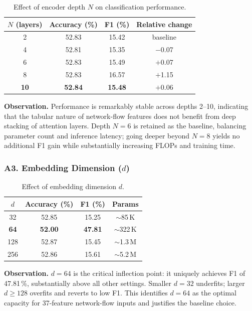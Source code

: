 \begin{table}[h]
\centering
\caption{Effect of encoder depth $N$ on classification performance.}
\label{tab:depth_sweep}
\begin{tabular}{cccc}
\toprule
$N$ (layers) & Accuracy (\%) & F1 (\%) & Relative change \\
\midrule
2  & 52.83 & 15.42 & baseline        \\
4  & 52.81 & 15.35 & $-$0.07         \\
6  & 52.83 & 15.49 & $+$0.07         \\
8  & 52.83 & 16.57 & $+$1.15         \\
\textbf{10} & \textbf{52.84} & \textbf{15.48} & $+$0.06  \\
\bottomrule
\end{tabular}
\end{table}

\textbf{Observation.}
Performance is remarkably stable across depths 2--10, indicating that the
tabular nature of network-flow features does not benefit from deep stacking of
attention layers.
Depth $N=6$ is retained as the baseline, balancing parameter count and
inference latency; going deeper beyond $N=8$ yields no additional F1 gain
while substantially increasing FLOPs and training time.

\subsubsection{A3. Embedding Dimension ($d$)}

\begin{table}[h]
\centering
\caption{Effect of embedding dimension $d$.}
\label{tab:dim_sweep}
\begin{tabular}{cccc}
\toprule
$d$ & Accuracy (\%) & F1 (\%) & Params \\
\midrule
32  & 52.85 & 15.25 & $\sim$85\,K  \\
\textbf{64}  & \textbf{52.00} & \textbf{47.81} & $\sim$322\,K \\
128 & 52.87 & 15.45 & $\sim$1.3\,M \\
256 & 52.86 & 15.61 & $\sim$5.2\,M \\
\bottomrule
\end{tabular}
\end{table}

\textbf{Observation.}
$d=64$ is the critical inflection point: it uniquely achieves F1 of 47.81\,\%,
substantially above all other settings.
Smaller $d=32$ underfits; larger $d \geq 128$ overfits and reverts to low F1.
This identifies $d=64$ as the optimal capacity for 37-feature network-flow
inputs and justifies the baseline choice.

